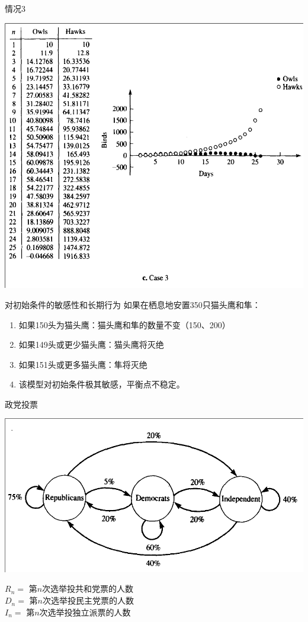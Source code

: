 \documentclass{beamer}
\begin{document}
\begin{frame}{情况3}
  \begin{center}
    \includegraphics[height=.9\textheight{}]{owl-3.png}
  \end{center}  
\end{frame}

\begin{frame}{对初始条件的敏感性和长期行为}
  如果在栖息地安置350只猫头鹰和隼：

  \begin{enumerate}
  \item<1-> 如果150头为猫头鹰：猫头鹰和隼的数量不变（150、200）
  \item<2-> 如果149头或更少猫头鹰：猫头鹰将灭绝
  \item<3-> 如果151头或更多猫头鹰：隼将灭绝
  \item<4-> 该模型对初始条件极其敏感，平衡点不稳定。
  \end{enumerate}

\end{frame}

\begin{frame}{政党投票}
  \begin{center}
    \includegraphics[width=.6\textwidth{}]{party.png}
  \end{center}  
  
  \begin{definition}
    $R_n = $ 第$n$次选举投共和党票的人数\\
    $D_n = $ 第$n$次选举投民主党票的人数\\
    $I_n = $ 第$n$次选举投独立派票的人数
  \end{definition}
  
\end{frame}
\end{document}
